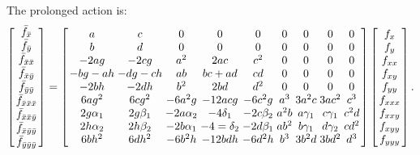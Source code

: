 \documentclass[review,onefignum,onetabnum]{siamonline190516}
\begin{document}
{The prolonged action is:
\begin{equation}
\arraycolsep=1.4pt
\label{eq:prolong}
\left[
\begin{array}{c}
  \bar f_{\bar x} \\ \bar f_{\bar y} \\ \bar f_{\bar x \bar x} \\ \bar f_{\bar x \bar y} \\ \bar f_{\bar y \bar y} \\ \bar f_{\bar x \bar x \bar x} \\ \bar f_{\bar x \bar x \bar y} \\ \bar f_{\bar x \bar y \bar y} \\ \bar f_{ \bar y \bar y \bar y} 
 \end{array}
 \right]
 = 
\left[
\begin{array}{ccccccccc}
 a & c & 0 & 0 & 0 & 0 & 0 & 0 & 0 \\
 b & d & 0 & 0 & 0 & 0 & 0 & 0 & 0 \\
 -2 a g & -2 c g & a^2 & 2 a c & c^2 & 0 & 0 & 0 & 0 \\
 -b g-a h & -d g-c h & a b & b c+a d & c d & 0 & 0 & 0 & 0 \\
 -2 b h & -2 d h & b^2 & 2 b d & d^2 & 0 & 0 & 0 & 0 \\
 6 a g^2 & 6 c g^2 & -6 a^2 g & -12 a c g & -6 c^2 g & a^3 & 3 a^2 c & 3 a c^2 & c^3 \\
 2 g \alpha_1 & 2 g \beta_1 & -2 a \alpha_2 & -4 \delta_1 & -2 c \beta_2
   & a^2 b & a \gamma_1 & c \gamma_1 & c^2 d \\
 2 h \alpha_2 & 2 h \beta_2 & -2 b \alpha_1 & -4 = \delta_2 & -2 d \beta_1
   & a b^2 & b \gamma_1 & d \gamma_2 & c d^2 \\
 6 b h^2 & 6 d h^2 & -6 b^2 h & -12 b d h & -6 d^2 h & b^3 & 3 b^2 d & 3 b d^2 & d^3 \\
\end{array}
\right]\left[
\begin{array}{c}
f_x \\ f_y \\ f_{xx} \\ f_{xy} \\ f_{yy} \\ f_{xxx} \\ f_{xxy} \\ f_{xyy} \\ f_{yyy} 
 \end{array}
 \right].%
 \end{equation}

}
\end{document}
